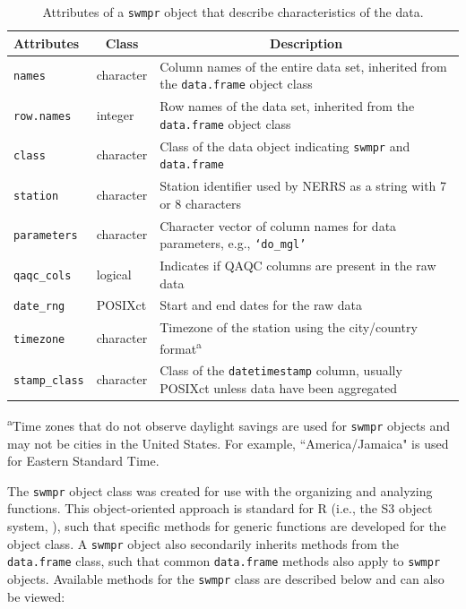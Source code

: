 \documentclass[10pt,letterpaper]{article}\usepackage[]{graphicx}\usepackage[]{color}
\begin{document}
\begin{table}[!tbp]
\caption{Attributes of a \texttt{swmpr} object that describe characteristics of the data.\label{tab:attributes}} 
\begin{center}
\begin{tabular}{lp{0.75in}p{3.25in}}
\hline\hline
\multicolumn{1}{l}{Attributes}&\multicolumn{1}{c}{Class}&\multicolumn{1}{c}{Description}\tabularnewline
\hline
\texttt{names}&character&Column names of the entire data set, inherited from the \texttt{data.frame} object class\tabularnewline
\texttt{row.names}&integer&Row names of the data set, inherited from the \texttt{data.frame} object class\tabularnewline
\texttt{class}&character&Class of the data object indicating \texttt{swmpr} and \texttt{data.frame}\tabularnewline
\texttt{station}&character&Station identifier used by \gls{NERRS} as a string with 7 or 8 characters\tabularnewline
\texttt{parameters}&character&Character vector of column names for data parameters, e.g., \texttt{`do\_mgl'}\tabularnewline
\texttt{qaqc\_cols}&logical&Indicates if \gls{QAQC} columns are present in the raw data\tabularnewline
\texttt{date\_rng}&POSIXct&Start and end dates for the raw data\tabularnewline
\texttt{timezone}&character&Timezone of the station using the city/country format\textsuperscript{a}\tabularnewline
\texttt{stamp\_class}&character&Class of the \texttt{datetimestamp} column, usually POSIXct unless data have been aggregated\tabularnewline
\hline
\end{tabular}\end{center}

\textsuperscript{a}\footnotesize Time zones that do not observe daylight savings are used for \texttt{swmpr} objects and may not be cities in the United States.  For example, ``America/Jamaica" is used for Eastern Standard Time.\end{table}


The \texttt{swmpr} object class was created for use with the organizing and analyzing functions.  This object-oriented approach is standard for R (i.e., the S3 object  system, \cite{Wickham14}), such that specific methods for generic functions are developed for the object class.  A \texttt{swmpr} object also secondarily inherits methods from the \texttt{data.frame} class, such that common \texttt{data.frame} methods also apply to \texttt{swmpr} objects.  Available methods for the \texttt{swmpr} class are described below and can also be viewed:
 
\end{document}
